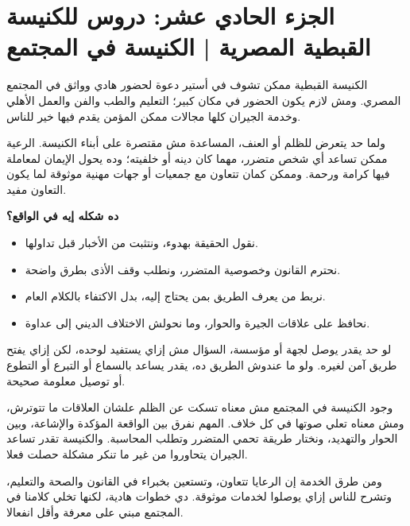 \documentclass[12pt,a4paper]{article}
\begin{document}
\section*{الجزء الحادي عشر: دروس للكنيسة القبطية المصرية | الكنيسة في المجتمع}
الكنيسة القبطية ممكن تشوف في أستير دعوة لحضور هادي وواثق في المجتمع المصري. ومش لازم يكون الحضور في مكان كبير؛ التعليم والطب والفن والعمل الأهلي وخدمة الجيران كلها مجالات ممكن المؤمن يقدم فيها خير للناس.\par\medskip
ولما حد يتعرض للظلم أو العنف، المساعدة مش مقتصرة على أبناء الكنيسة. الرعية ممكن تساعد أي شخص متضرر، مهما كان دينه أو خلفيته؛ وده يحول الإيمان لمعاملة فيها كرامة ورحمة. وممكن كمان تتعاون مع جمعيات أو جهات مهنية موثوقة لما يكون التعاون مفيد.\par\medskip
\vspace{0.2em}\noindent\textcolor{ochre}{\textbf{ده شكله إيه في الواقع؟}}\par\smallskip
\begin{itemize}[rightmargin=1.2em,leftmargin=0.5em,itemsep=0.25em,topsep=0.2em]
\item نقول الحقيقة بهدوء، ونتثبت من الأخبار قبل تداولها.
\item نحترم القانون وخصوصية المتضرر، ونطلب وقف الأذى بطرق واضحة.
\item نربط من يعرف الطريق بمن يحتاج إليه، بدل الاكتفاء بالكلام العام.
\item نحافظ على علاقات الجيرة والحوار، وما نحولش الاختلاف الديني إلى عداوة.
\end{itemize}\medskip
لو حد يقدر يوصل لجهة أو مؤسسة، السؤال مش إزاي يستفيد لوحده، لكن إزاي يفتح طريق آمن لغيره. ولو ما عندوش الطريق ده، يقدر يساعد بالسماع أو التبرع أو التطوع أو توصيل معلومة صحيحة.\par\medskip
وجود الكنيسة في المجتمع مش معناه تسكت عن الظلم علشان العلاقات ما تتوترش، ومش معناه تعلي صوتها في كل خلاف. المهم نفرق بين الواقعة المؤكدة والإشاعة، وبين الحوار والتهديد، ونختار طريقة تحمي المتضرر وتطلب المحاسبة. والكنيسة تقدر تساعد الجيران يتحاوروا من غير ما تنكر مشكلة حصلت فعلا.\par\medskip
ومن طرق الخدمة إن الرعايا تتعاون، وتستعين بخبراء في القانون والصحة والتعليم، وتشرح للناس إزاي يوصلوا لخدمات موثوقة. دي خطوات هادية، لكنها تخلي كلامنا في المجتمع مبني على معرفة وأقل انفعالا.\par\medskip
\clearpage
\clearpage
\end{document}
